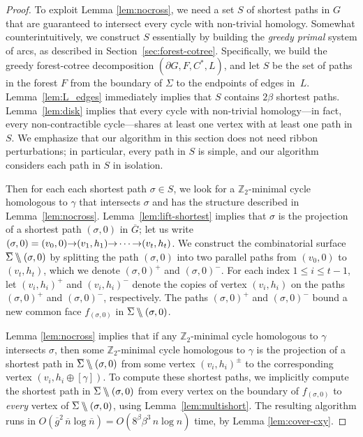 \documentclass[letterpaper,review]{siamart190516}
\def\arcto{\mathord\shortrightarrow}
\def\Z{\mathbb{Z}}
\def\snip{\mathbin{\raisebox{0.15ex}{\rotatebox[origin=c]{60}{\Rightscissors}\!}}}
\def\snip{\mathbin{\backslash\!\!\backslash}}
\def\cycle{\gamma}
\def\Sigmabar{\overline{\smash{\Sigma}\vphantom{t}}}
\def\nbar{\overline{n}}
\def\gbar{\overline{g}}
\def\rnote#1{\color{red}Review: #1 \color{black}}
\def\jnote#1{\textcolor{orange}{Jeff: #1}}
\begin{document}
{\begin{proof}
To exploit Lemma \ref{lem:nocross}, we need a set $S$ of shortest paths in $G$ that are guaranteed to intersect every cycle with non-trivial homology.  Somewhat counterintuitively, we construct $S$ essentially by building the \emph{greedy primal} system of arcs, as described in Section~\ref{sec:forest-cotree}.  Specifically, we build the greedy forest-cotree decomposition $(\partial G, F, C^*, L)$, and let $S$ be the set of paths in the forest $F$ from the boundary of $\Sigma$ to the endpoints of edges in~$L$.  Lemma~\ref{lem:L_edges} immediately implies that $S$ contains $2\beta$ shortest paths.  Lemma~\ref{lem:disk} implies that every cycle with non-trivial homology---in fact, every non-contractible cycle---shares at least one vertex with at least one path in $S$.  We emphasize that our algorithm in this section does not need ribbon perturbations; in particular, every path in $S$ is simple, and our algorithm considers each path in $S$ in isolation.

Then for each each shortest path $\sigma\in S$, we look for a $\Z_2$-minimal cycle homologous to $\gamma$ that intersects $\sigma$ and has the structure described in Lemma~\ref{lem:nocross}.  Lemma~\ref{lem:lift-shortest} implies that $\sigma$ is the projection of a shortest path $(\sigma,0)$ in $\overline{G}$; let us write $(\sigma,0) = (v_0,0) \arcto (v_1,h_1) \arcto\allowbreak \cdots\arcto (v_t, h_t)$.  We construct the combinatorial surface $\Sigmabar\snip(\sigma,0)$ by splitting the path $(\sigma,0)$ into two parallel paths from $(v_0,0)$ to $(v_t,h_t)$, which we denote  $(\sigma,0)^+$ and $(\sigma,0)^-$.  For each index $1\le i\le t-1$, let $(v_i,h_i)^+$ and $(v_i,h_i)^-$ denote the copies of vertex $(v_i,h_i)$  on the paths $(\sigma,0)^+$ and $(\sigma,0)^-$, respectively.  The paths $(\sigma,0)^+$ and $(\sigma,0)^-$ bound a new common face $f_{(\sigma,0)}$ in $\Sigmabar\snip(\sigma,0)$.

Lemma \ref{lem:nocross} implies that if any $\Z_2$-minimal cycle homologous to $\cycle$ intersects $\sigma$, then some $\Z_2$-minimal cycle homologous to $\cycle$ is the projection of a shortest path in $\Sigmabar\snip(\sigma,0)$ from some vertex $(v_i,h_i)^\pm$ to the corresponding vertex $(v_i, h_i\oplus[\cycle])$.  To compute these shortest paths, we implicitly compute the shortest path in $\Sigmabar\snip(\sigma,0)$ from every vertex on the boundary of $f_{(\sigma,0)}$ to \emph{every} vertex of $\Sigmabar\snip(\sigma,0)$, using Lemma~\ref{lem:multishort}.
The resulting algorithm runs in $O(\gbar^2\,\nbar \log \nbar) = O(8^\beta \beta^3\, n\log n)$ time, by Lemma \ref{lem:cover-cxy}.
\end{proof}
%

}
\end{document}
